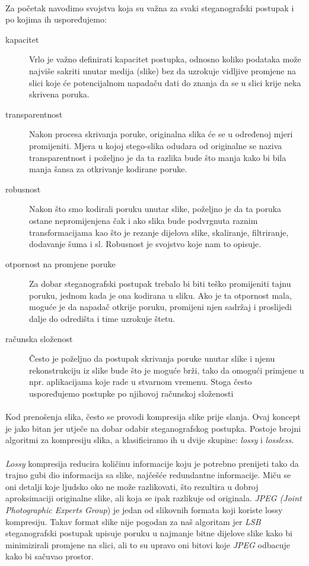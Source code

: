 \documentclass[times, utf8, seminar]{fer}
\begin{document}
\paragraph{}
Za početak navodimo svojstva koja su važna za svaki steganografski postupak i po kojima ih uspoređujemo:
\begin{description}

\item[kapacitet] Vrlo je važno definirati kapacitet postupka, odnosno koliko podataka može najviše sakriti unutar medija (slike) bez da uzrokuje vidljive promjene na slici koje će potencijalnom napadaču dati do znanja da se u slici krije neka skrivena poruka.
\item[transparentnost] Nakon procesa skrivanja poruke, originalna slika će se u određenoj mjeri promijeniti. Mjera u kojoj stego-slika odudara od originalne se naziva transparentnost i poželjno je da ta razlika bude što manja kako bi bila manja šansa za otkrivanje kodirane poruke.
\item[robusnost]  Nakon što smo kodirali poruku unutar slike, poželjno je da ta poruka ostane nepromijenjena čak i ako slika bude podvrgnuta raznim transformacijama kao što je rezanje dijelova slike, skaliranje, filtriranje, dodavanje šuma i sl. Robusnost je svojstvo koje nam to opisuje.
\item[otpornost na promjene poruke] Za dobar steganografski postupak trebalo bi biti teško promijeniti tajnu poruku, jednom kada je ona kodirana u sliku. Ako je ta otpornost mala, moguće je da napadač otkrije poruku, promijeni njen sadržaj i proslijedi dalje do odredišta i time uzrokuje štetu.
\item[računska složenost] Često je poželjno da postupak skrivanja poruke unutar slike i njenu rekonstrukciju iz slike bude što je moguće brži, tako da omogući primjene u npr. aplikacijama koje rade u stvarnom vremenu. Stoga često uspoređujemo postupke po njihovoj računskoj složenosti
\end{description}
\paragraph{}
Kod prenošenja slika, često se provodi kompresija slike prije slanja. Ovaj koncept je jako bitan jer utječe na dobar odabir steganografskog postupka. Postoje brojni algoritmi za kompresiju slika, a klasificiramo ih u dvije skupine: \textit{lossy} i \textit{lossless}.
\paragraph{}
\textit{Lossy} kompresija reducira količinu informacije koju je potrebno prenijeti tako da trajno gubi dio informacija sa slike, najčešće redundantne informacije. Miču se oni detalji koje ljudsko oko ne može razlikovati, što rezultira u dobroj aproksimaciji originalne slike, ali koja se ipak razlikuje od originala. \textit{JPEG (Joint Photographic Experts Group}) je jedan od slikovnih formata koji koriste lossy kompresiju. Takav format slike nije pogodan za naš algoritam jer \textit{LSB} steganografski postupak upisuje poruku u najmanje bitne dijelove slike kako bi minimizirali promjene na slici, ali to su upravo oni bitovi koje \textit{JPEG} odbacuje kako bi sačuvao prostor.
\end{document}
